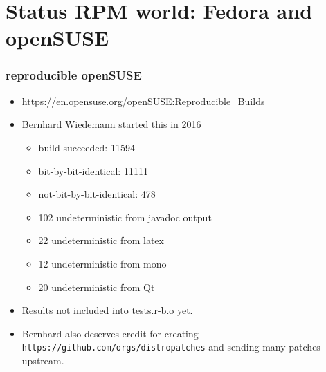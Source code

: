 \documentclass[14pt,aspectratio=169]{beamer}
\begin{document}
\section{Status RPM world: Fedora and openSUSE}

\begin{frame}
 \frametitle{reproducible openSUSE}
 \begin{itemize}
	 \item \url{https://en.opensuse.org/openSUSE:Reproducible\_Builds}
  \item Bernhard Wiedemann started this in 2016
  \begin{itemize}
   \item build-succeeded: 11594
   \item bit-by-bit-identical: 11111
   \item not-bit-by-bit-identical: 478
 \end{itemize}
  \begin{itemize}
   \item<2-4> 102 undeterministic from javadoc output
   \item<2-4> 22 undeterministic from latex
   \item<2-4> 12 undeterministic from mono
   \item<2-4> 20 undeterministic from Qt
 \end{itemize}
 \item<3-4> Results not included into \url{tests.r-b.o} yet.
 \item<4> Bernhard also deserves credit for creating \texttt{https://github.com/orgs/distropatches} and sending many patches upstream.
 \end{itemize}
\end{frame}
\end{document}
